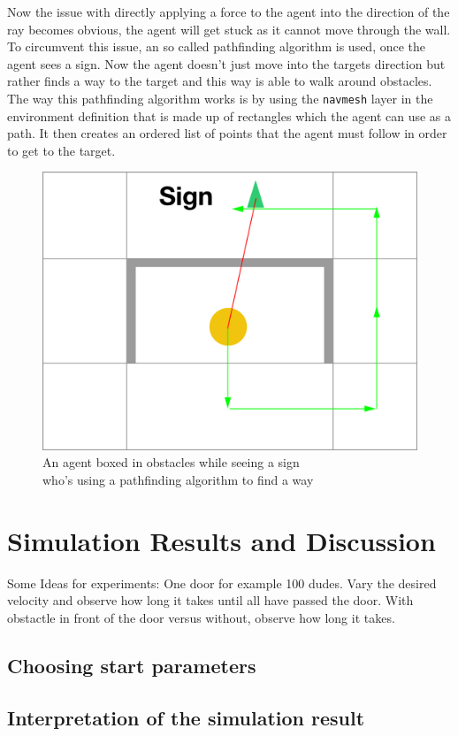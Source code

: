 \documentclass[11pt]{article}
\begin{document}
\begin{itemize}
	Now the issue with directly applying a force to the agent into the direction of the ray becomes obvious, the agent will get stuck as it cannot move through the wall. To circumvent this issue, an so called pathfinding algorithm is used, once the agent sees a sign. Now the agent doesn't just move into the targets direction but rather finds a way to the target and this way is able to walk around obstacles. The way this pathfinding algorithm works is by using the \texttt{navmesh} layer in the environment definition that is made up of rectangles which the agent can use as a path. It then creates an ordered list of points that the agent must follow in order to get to the target.
	
	\begin{figure}[H]
		\centering
		\includegraphics[width=0.5\linewidth]{assets/with-navmesh}\\
		An agent boxed in obstacles while seeing a sign\\
		who's using a pathfinding algorithm to find a way
	\end{figure}
    
\end{itemize}

\section{Simulation Results and Discussion}

Some Ideas for experiments: One door for example 100 dudes. Vary the desired velocity and observe how long it takes until all have passed the door.
With obstactle in front of the door versus without, observe how long it takes.


\subsection{Choosing start parameters}

\subsection{Interpretation of the simulation result}
\end{document}
